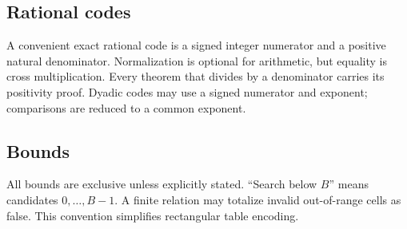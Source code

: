 \subsection{Rational codes}

A convenient exact rational code is a signed integer numerator and a positive natural denominator.  Normalization is optional for arithmetic, but equality is cross multiplication.  Every theorem that divides by a denominator carries its positivity proof.  Dyadic codes may use a signed numerator and exponent; comparisons are reduced to a common exponent.

\subsection{Bounds}

All bounds are exclusive unless explicitly stated.  ``Search below \(B\)'' means candidates \(0,\ldots,B-1\).  A finite relation may totalize invalid out-of-range cells as false.  This convention simplifies rectangular table encoding.
